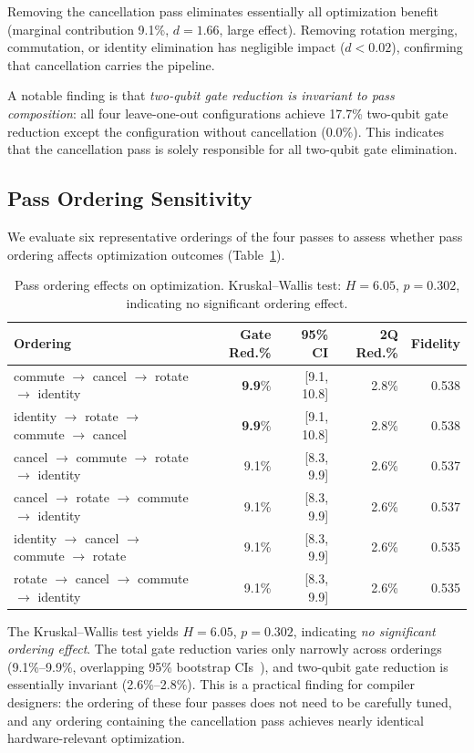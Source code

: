 \documentclass[sigconf,nonacm]{acmart}
\begin{document}
Removing the cancellation pass eliminates essentially all optimization benefit (marginal contribution 9.1\%, $d = 1.66$, large effect). Removing rotation merging, commutation, or identity elimination has negligible impact ($d < 0.02$), confirming that cancellation carries the pipeline.

A notable finding is that \emph{two-qubit gate reduction is invariant to pass composition}: all four leave-one-out configurations achieve 17.7\% two-qubit gate reduction except the configuration without cancellation (0.0\%). This indicates that the cancellation pass is solely responsible for all two-qubit gate elimination.

\subsection{Pass Ordering Sensitivity}

We evaluate six representative orderings of the four passes to assess whether pass ordering affects optimization outcomes (Table~\ref{tab:ablation-ord}).

\begin{table}[t]
\centering
\caption{Pass ordering effects on optimization. Kruskal--Wallis test: $H = 6.05$, $p = 0.302$, indicating no significant ordering effect.}
\label{tab:ablation-ord}
\begin{tabular}{lrrrr}
\toprule
\textbf{Ordering} & \textbf{Gate Red.\%} & \textbf{95\% CI} & \textbf{2Q Red.\%} & \textbf{Fidelity} \\
\midrule
commute $\to$ cancel $\to$ rotate $\to$ identity & \textbf{9.9}\% & [9.1, 10.8] & 2.8\% & 0.538 \\
identity $\to$ rotate $\to$ commute $\to$ cancel & \textbf{9.9}\% & [9.1, 10.8] & 2.8\% & 0.538 \\
cancel $\to$ commute $\to$ rotate $\to$ identity & 9.1\% & [8.3, 9.9] & 2.6\% & 0.537 \\
cancel $\to$ rotate $\to$ commute $\to$ identity & 9.1\% & [8.3, 9.9] & 2.6\% & 0.537 \\
identity $\to$ cancel $\to$ commute $\to$ rotate & 9.1\% & [8.3, 9.9] & 2.6\% & 0.535 \\
rotate $\to$ cancel $\to$ commute $\to$ identity & 9.1\% & [8.3, 9.9] & 2.6\% & 0.535 \\
\bottomrule
\end{tabular}
\end{table}

The Kruskal--Wallis test yields $H = 6.05$, $p = 0.302$, indicating \emph{no significant ordering effect}. The total gate reduction varies only narrowly across orderings (9.1\%--9.9\%, overlapping 95\% bootstrap CIs~\cite{efron1993bootstrap}), and two-qubit gate reduction is essentially invariant (2.6\%--2.8\%). This is a practical finding for compiler designers: the ordering of these four passes does not need to be carefully tuned, and any ordering containing the cancellation pass achieves nearly identical hardware-relevant optimization.
\end{document}
